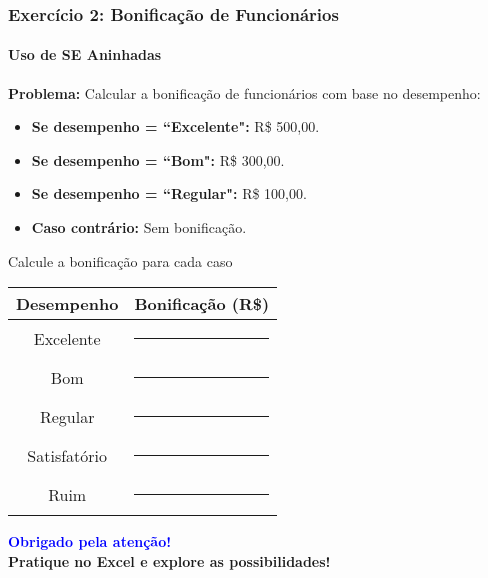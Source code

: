 \documentclass[12pt]{beamer}
\begin{document}
\begin{frame}
    \frametitle{Exercício 2: Bonificação de Funcionários}
    \framesubtitle{Uso de SE Aninhadas}
    \textbf{Problema:} Calcular a bonificação de funcionários com base no desempenho:
    \begin{itemize}
        \item \textbf{Se desempenho = ``Excelente":} R\$ 500,00.
        \item \textbf{Se desempenho = ``Bom":} R\$ 300,00.
        \item \textbf{Se desempenho = ``Regular":} R\$ 100,00.
        \item \textbf{Caso contrário:} Sem bonificação.
    \end{itemize}

    \begin{exampleblock}{Calcule a bonificação para cada caso}
        \begin{tabular}{|c|c|}
            \hline
            \textbf{Desempenho} & \textbf{Bonificação (R\$)} \\ \hline
            Excelente & \rule{2cm}{} \\ \hline
            Bom & \rule{2cm}{} \\ \hline
            Regular & \rule{2cm}{} \\ \hline
            Satisfatório & \rule{2cm}{} \\ \hline
            Ruim & \rule{2cm}{} \\ \hline
        \end{tabular}
    \end{exampleblock}
\end{frame}

\begin{frame}
    \begin{center}
        \textbf{\textcolor{blue}{\Large Obrigado pela atenção!}} \\[0.5cm]
        \textbf{Pratique no Excel e explore as possibilidades!}
    \end{center}
\end{frame}
\end{document}
